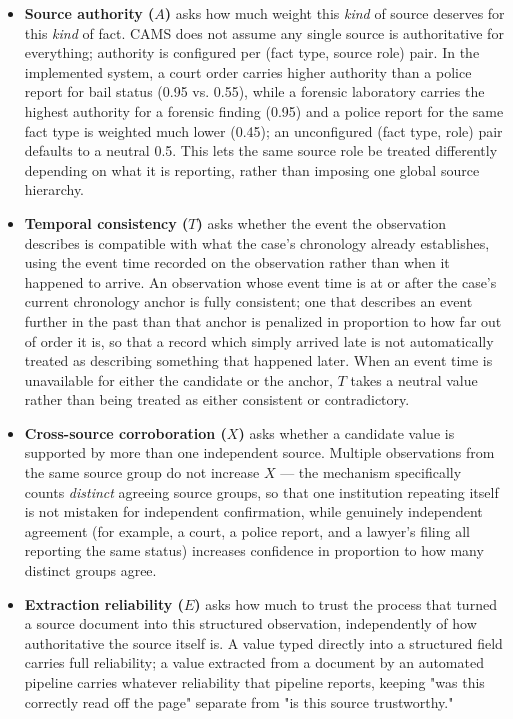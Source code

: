 \documentclass[conference]{IEEEtran}
\begin{document}
\begin{itemize}
\item \textbf{Source authority ($A$)} asks how much weight this \emph{kind}
of source deserves for this \emph{kind} of fact. CAMS does not assume any
single source is authoritative for everything; authority is configured per
(fact type, source role) pair. In the implemented system, a court order
carries higher authority than a police report for bail status (0.95 vs.
0.55), while a forensic laboratory carries the highest authority for a
forensic finding (0.95) and a police report for the same fact type is
weighted much lower (0.45); an unconfigured (fact type, role) pair defaults
to a neutral 0.5. This lets the same source role be treated differently
depending on what it is reporting, rather than imposing one global source
hierarchy.
\item \textbf{Temporal consistency ($T$)} asks whether the event the
observation describes is compatible with what the case's chronology already
establishes, using the event time recorded on the observation rather than
when it happened to arrive. An observation whose event time is at or after
the case's current chronology anchor is fully consistent; one that
describes an event further in the past than that anchor is penalized in
proportion to how far out of order it is, so that a record which simply
arrived late is not automatically treated as describing something that
happened later. When an event time is unavailable for either the candidate
or the anchor, $T$ takes a neutral value rather than being treated as
either consistent or contradictory.
\item \textbf{Cross-source corroboration ($X$)} asks whether a candidate
value is supported by more than one independent source. Multiple
observations from the same source group do not increase $X$ --- the
mechanism specifically counts \emph{distinct} agreeing source groups, so
that one institution repeating itself is not mistaken for independent
confirmation, while genuinely independent agreement (for example, a court,
a police report, and a lawyer's filing all reporting the same status)
increases confidence in proportion to how many distinct groups agree.
\item \textbf{Extraction reliability ($E$)} asks how much to trust the
process that turned a source document into this structured observation,
independently of how authoritative the source itself is. A value typed
directly into a structured field carries full reliability; a value
extracted from a document by an automated pipeline carries whatever
reliability that pipeline reports, keeping "was this correctly read off the
page" separate from "is this source trustworthy."
\end{itemize}
\end{document}

